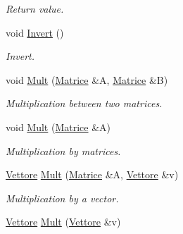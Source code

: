 \begin{DoxyCompactItemize}
\begin{DoxyCompactList}\small\item\em Return value. \end{DoxyCompactList}\item 
void \hyperlink{classMatrice_acd68476b8afc6a2dcfb8663ead8b39cd}{Invert} ()\hypertarget{classMatrice_acd68476b8afc6a2dcfb8663ead8b39cd}{}\label{classMatrice_acd68476b8afc6a2dcfb8663ead8b39cd}

\begin{DoxyCompactList}\small\item\em Invert. \end{DoxyCompactList}\item 
void \hyperlink{classMatrice_abcf6a7d18ac795ba9ae4f2d0af5fd983}{Mult} (\hyperlink{classMatrice}{Matrice} \&A, \hyperlink{classMatrice}{Matrice} \&B)\hypertarget{classMatrice_abcf6a7d18ac795ba9ae4f2d0af5fd983}{}\label{classMatrice_abcf6a7d18ac795ba9ae4f2d0af5fd983}

\begin{DoxyCompactList}\small\item\em Multiplication between two matrices. \end{DoxyCompactList}\item 
void \hyperlink{classMatrice_a52a3ee1bffb7d482d9bbf526e55855ac}{Mult} (\hyperlink{classMatrice}{Matrice} \&A)\hypertarget{classMatrice_a52a3ee1bffb7d482d9bbf526e55855ac}{}\label{classMatrice_a52a3ee1bffb7d482d9bbf526e55855ac}

\begin{DoxyCompactList}\small\item\em Multiplication by matrices. \end{DoxyCompactList}\item 
\hyperlink{classVettore}{Vettore} \hyperlink{classMatrice_a59cbe4933e70b969b4eed6027637d08f}{Mult} (\hyperlink{classMatrice}{Matrice} \&A, \hyperlink{classVettore}{Vettore} \&v)\hypertarget{classMatrice_a59cbe4933e70b969b4eed6027637d08f}{}\label{classMatrice_a59cbe4933e70b969b4eed6027637d08f}

\begin{DoxyCompactList}\small\item\em Multiplication by a vector. \end{DoxyCompactList}\item 
\hyperlink{classVettore}{Vettore} \hyperlink{classMatrice_af36b6d3637e838ca5e695c27a598df13}{Mult} (\hyperlink{classVettore}{Vettore} \&v)\hypertarget{classMatrice_af36b6d3637e838ca5e695c27a598df13}{}\label{classMatrice_af36b6d3637e838ca5e695c27a598df13}


\end{DoxyCompactItemize}
